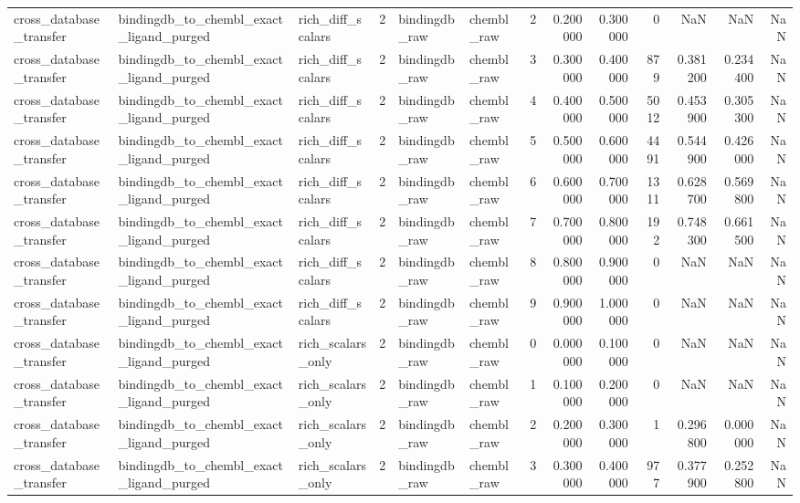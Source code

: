 \begin{longtable}{lllrllrrrrrrr}
cross\_database\_transfer & bindingdb\_to\_chembl\_exact\_ligand\_purged & rich\_diff\_scalars & 2 & bindingdb\_raw & chembl\_raw & 2 & 0.200000 & 0.300000 & 0 & NaN & NaN & NaN \\
cross\_database\_transfer & bindingdb\_to\_chembl\_exact\_ligand\_purged & rich\_diff\_scalars & 2 & bindingdb\_raw & chembl\_raw & 3 & 0.300000 & 0.400000 & 879 & 0.381200 & 0.234400 & NaN \\
cross\_database\_transfer & bindingdb\_to\_chembl\_exact\_ligand\_purged & rich\_diff\_scalars & 2 & bindingdb\_raw & chembl\_raw & 4 & 0.400000 & 0.500000 & 5012 & 0.453900 & 0.305300 & NaN \\
cross\_database\_transfer & bindingdb\_to\_chembl\_exact\_ligand\_purged & rich\_diff\_scalars & 2 & bindingdb\_raw & chembl\_raw & 5 & 0.500000 & 0.600000 & 4491 & 0.544900 & 0.426000 & NaN \\
cross\_database\_transfer & bindingdb\_to\_chembl\_exact\_ligand\_purged & rich\_diff\_scalars & 2 & bindingdb\_raw & chembl\_raw & 6 & 0.600000 & 0.700000 & 1311 & 0.628700 & 0.569800 & NaN \\
cross\_database\_transfer & bindingdb\_to\_chembl\_exact\_ligand\_purged & rich\_diff\_scalars & 2 & bindingdb\_raw & chembl\_raw & 7 & 0.700000 & 0.800000 & 192 & 0.748300 & 0.661500 & NaN \\
cross\_database\_transfer & bindingdb\_to\_chembl\_exact\_ligand\_purged & rich\_diff\_scalars & 2 & bindingdb\_raw & chembl\_raw & 8 & 0.800000 & 0.900000 & 0 & NaN & NaN & NaN \\
cross\_database\_transfer & bindingdb\_to\_chembl\_exact\_ligand\_purged & rich\_diff\_scalars & 2 & bindingdb\_raw & chembl\_raw & 9 & 0.900000 & 1.000000 & 0 & NaN & NaN & NaN \\
cross\_database\_transfer & bindingdb\_to\_chembl\_exact\_ligand\_purged & rich\_scalars\_only & 2 & bindingdb\_raw & chembl\_raw & 0 & 0.000000 & 0.100000 & 0 & NaN & NaN & NaN \\
cross\_database\_transfer & bindingdb\_to\_chembl\_exact\_ligand\_purged & rich\_scalars\_only & 2 & bindingdb\_raw & chembl\_raw & 1 & 0.100000 & 0.200000 & 0 & NaN & NaN & NaN \\
cross\_database\_transfer & bindingdb\_to\_chembl\_exact\_ligand\_purged & rich\_scalars\_only & 2 & bindingdb\_raw & chembl\_raw & 2 & 0.200000 & 0.300000 & 1 & 0.296800 & 0.000000 & NaN \\
cross\_database\_transfer & bindingdb\_to\_chembl\_exact\_ligand\_purged & rich\_scalars\_only & 2 & bindingdb\_raw & chembl\_raw & 3 & 0.300000 & 0.400000 & 977 & 0.377900 & 0.252800 & NaN \\

\end{longtable}
